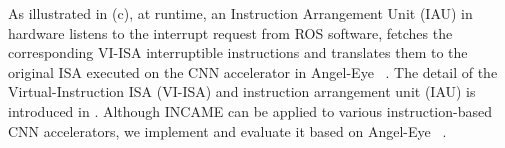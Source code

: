 As illustrated in (c), at runtime, an Instruction Arrangement Unit (IAU) in hardware listens to the interrupt request from ROS software, fetches the corresponding VI-ISA interruptible instructions and translates them to the original ISA executed on the CNN accelerator in Angel-Eye  ~\cite{guo2017angel}. 
The detail of the Virtual-Instruction ISA (VI-ISA) and instruction arrangement unit (IAU) is introduced in . 
Although INCAME can be applied to various instruction-based CNN accelerators, we implement and evaluate it based on Angel-Eye  ~\cite{guo2017angel}.

